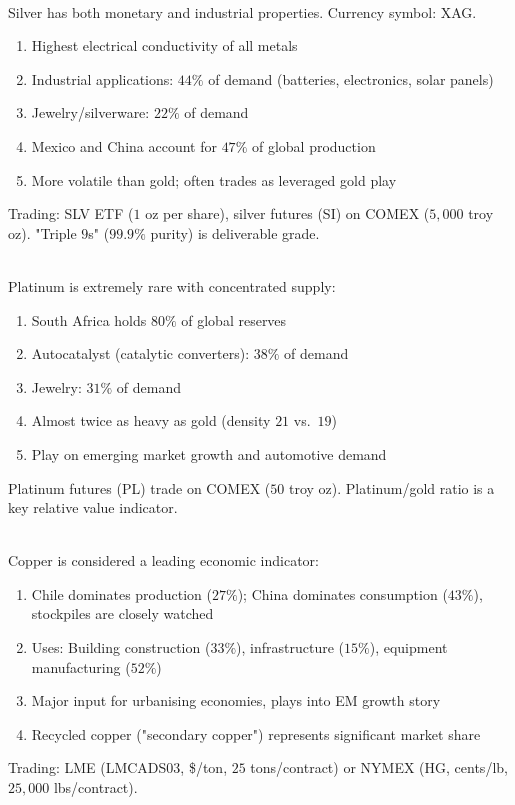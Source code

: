 \documentclass[a4paper,oneside,openany]{book}
\begin{document}
\begin{remark} \\
Silver has both monetary and industrial properties. Currency symbol: XAG.
\begin{enumerate}[label=\roman*.]
\setlength{\itemsep}{0pt}
\item Highest electrical conductivity of all metals
\item Industrial applications: $44\%$ of demand (batteries, electronics, solar panels)
\item Jewelry/silverware: $22\%$ of demand
\item Mexico and China account for $47\%$ of global production
\item More volatile than gold; often trades as leveraged gold play
\end{enumerate}
Trading: SLV ETF ($1$ oz per share), silver futures (SI) on COMEX ($5,000$ troy oz). "Triple $9$s" ($99.9\%$ purity) is deliverable grade.
\end{remark}

\begin{remark} \\
Platinum is extremely rare with concentrated supply:
\begin{enumerate}[label=\roman*.]
\setlength{\itemsep}{0pt}
\item South Africa holds $80\%$ of global reserves
\item Autocatalyst (catalytic converters): $38\%$ of demand
\item Jewelry: $31\%$ of demand
\item Almost twice as heavy as gold (density $21$ vs.\ $19$)
\item Play on emerging market growth and automotive demand
\end{enumerate}
Platinum futures (PL) trade on COMEX ($50$ troy oz). Platinum/gold ratio is a key relative value indicator.
\end{remark}

\begin{remark} \\
Copper is considered a leading economic indicator:
\begin{enumerate}[label=\roman*.]
\setlength{\itemsep}{0pt}
\item Chile dominates production ($27\%$); China dominates consumption ($43\%$), stockpiles are closely watched
\item Uses: Building construction ($33\%$), infrastructure ($15\%$), equipment manufacturing ($52\%$)
\item Major input for urbanising economies, plays into EM growth story
\item Recycled copper ("secondary copper") represents significant market share
\end{enumerate}
Trading: LME (LMCADS03, \$/ton, $25$ tons/contract) or NYMEX (HG, cents/lb, $25,000$ lbs/contract).
\end{remark}
\end{document}
